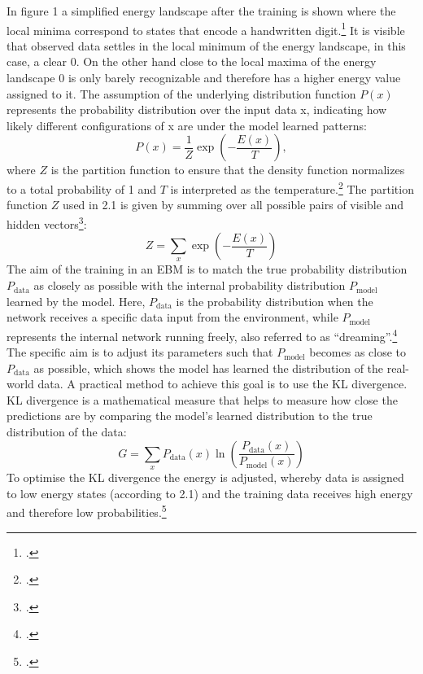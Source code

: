 In figure 1 a simplified energy landscape after the training is shown where the local minima correspond to states that encode a handwritten digit.\footcite[cf.][6]{huembeliPhysicsEnergybasedModels2022} It is visible that observed data settles in the local minimum of the energy landscape, in this case, a clear 0. On the other hand close to the local maxima of the energy landscape 0 is only barely recognizable and therefore has a higher energy value assigned to it.
The assumption of the underlying distribution function \( P(x) \) represents the probability distribution over the input data x,
indicating how likely different configurations of x are under the model learned patterns:
\begin{equation}
    P(x) = \frac{1}{Z} \exp\left(-\frac{E(x)}{T}\right),
\end{equation}
where \( Z \) is the partition function to ensure
that the density function normalizes to a total probability of 1 and \( T \) is interpreted as the temperature.\footcite[cf.][2-3]{huembeliPhysicsEnergybasedModels2022}
The partition function \( Z \) used in 2.1 is given by summing over all possible pairs of visible and hidden vectors\footcite[cf.][4]{hintonPracticalGuideTraining2012}:
\begin{equation}
    Z = \sum_x \exp\left(-\frac{E(x)}{T}\right)
    \label{partition_function}
\end{equation}
The aim of the training in an \ac{EBM} is to match the true probability distribution \( P_{\text{data}} \) as closely as possible with the internal probability distribution \( P_{\text{model}} \) learned by the model.
Here, \( P_{\text{data}} \) is the probability distribution when the network receives a specific data input from the environment, while \( P_{\text{model}} \) represents the internal network running freely, also referred to as ``dreaming''.\footcite[cf.][154-155]{ackleyLearningAlgorithmBoltzmann1985}
The specific aim is to adjust its parameters such that \( P_{\text{model}} \)
becomes as close to \( P_{\text{data}} \) as possible, which shows the model has learned the distribution of the real-world data.
A practical method to achieve this goal is to use the KL divergence. KL divergence is a mathematical measure that helps to measure how close the predictions are by comparing the model's learned distribution to the true distribution of the data:
\begin{equation}
    G = \sum_x P_{\text{data}}(x) \ln \left( \frac{P_{\text{data}}(x)}{P_{\text{model}}(x)} \right)
\end{equation}
To optimise the KL divergence the energy is adjusted, whereby data is assigned to low energy states (according to 2.1) and the training data receives high energy and therefore low probabilities.\footcite[cf.][2-3]{zhaiDeepStructuredEnergy2016}

